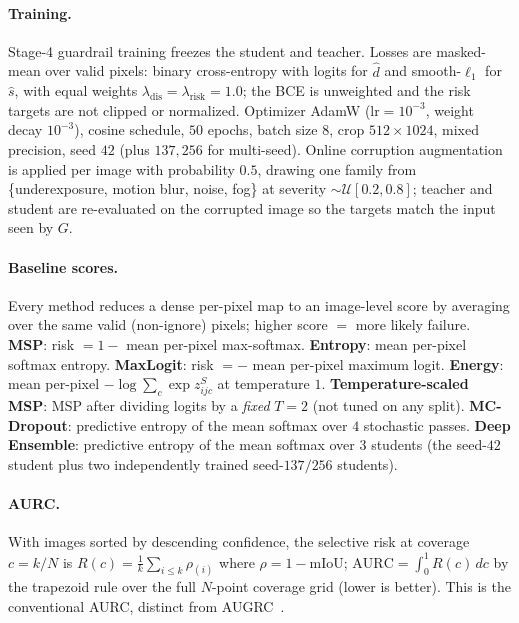 \documentclass{article}
\begin{document}
\paragraph{Training.} Stage-4 guardrail training freezes the student and teacher. Losses are masked-mean over valid pixels: binary cross-entropy with logits for $\hat d$ and smooth-$\ell_1$ for $\hat s$, with equal weights $\lambda_{\mathrm{dis}}{=}\lambda_{\mathrm{risk}}{=}1.0$; the BCE is unweighted and the risk targets are not clipped or normalized. Optimizer AdamW ($\text{lr}{=}10^{-3}$, weight decay $10^{-3}$), cosine schedule, $50$ epochs, batch size $8$, crop $512{\times}1024$, mixed precision, seed $42$ (plus $137,256$ for multi-seed). Online corruption augmentation is applied per image with probability $0.5$, drawing one family from \{underexposure, motion blur, noise, fog\} at severity $\sim\mathcal{U}[0.2,0.8]$; teacher and student are re-evaluated on the corrupted image so the targets match the input seen by $G$.

\paragraph{Baseline scores.} Every method reduces a dense per-pixel map to an image-level score by averaging over the same valid (non-ignore) pixels; higher score $=$ more likely failure. \textbf{MSP}: risk $=1-$ mean per-pixel max-softmax. \textbf{Entropy}: mean per-pixel softmax entropy. \textbf{MaxLogit}: risk $=-$ mean per-pixel maximum logit. \textbf{Energy}: mean per-pixel $-\log\sum_c\exp z^S_{ijc}$ at temperature $1$. \textbf{Temperature-scaled MSP}: MSP after dividing logits by a \emph{fixed} $T{=}2$ (not tuned on any split). \textbf{MC-Dropout}: predictive entropy of the mean softmax over $4$ stochastic passes. \textbf{Deep Ensemble}: predictive entropy of the mean softmax over $3$ students (the seed-$42$ student plus two independently trained seed-$137/256$ students).

\paragraph{AURC.} With images sorted by descending confidence, the selective risk at coverage $c{=}k/N$ is $R(c)=\tfrac1k\sum_{i\le k} \rho_{(i)}$ where $\rho=1-\mathrm{mIoU}$; $\mathrm{AURC}=\int_0^1 R(c)\,dc$ by the trapezoid rule over the full $N$-point coverage grid (lower is better). This is the conventional AURC, distinct from AUGRC~\citep{traub2024overcoming}.
\end{document}
